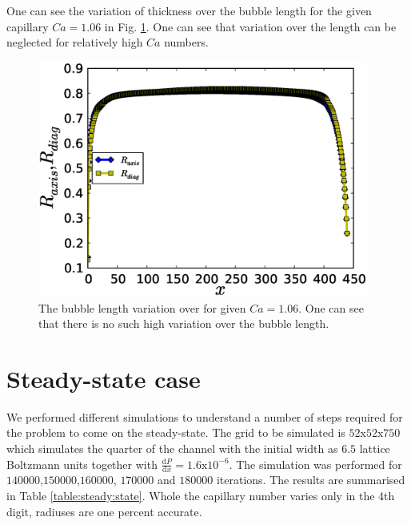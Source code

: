 \documentclass{article}
\begin{document}
One can see the variation of thickness over the bubble length for the given capillary $Ca=1.06$ in
Fig. \ref{fig:variation:bubble:ca:one}. One can see that variation over the length can be neglected
for relatively high $Ca$ numbers.
\begin{figure}
\includegraphics[width=0.97\textwidth]{Figures/bubble_length_ca_one.eps}
\caption{The bubble length variation over for given $Ca=1.06$.
One can see that there is no such high variation over the bubble
length. \label{fig:variation:bubble:ca:one}}
\end{figure}


\section{Steady-state case}
We performed different simulations to understand a number of steps required for the problem to come
on the steady-state. The grid to be simulated is $52\mathrm{x}52\mathrm{x}750$ which simulates the
quarter of the channel with the initial
width as $6.5$ lattice Boltzmann units together with $\frac{\mathrm{d}P}{\mathrm{d}x}=1.6
\mathrm{x}10^{-6}$. The simulation was performed for $140000$,$150000$,$160000$, $170000$ and
$180000$ iterations. The results are summarised in Table \ref{table:steady:state}. Whole the
capillary number varies only in the 4th digit, radiuses are one percent accurate. 
\end{document}
